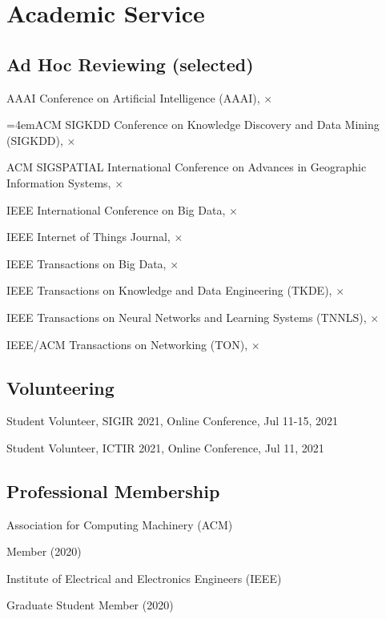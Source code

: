\section*{Academic Service}


\subsection*{\hspace{1.6em}Ad Hoc Reviewing (selected)}
\indent

AAAI Conference on Artificial Intelligence (AAAI), $\times$

\hangindent=4emACM SIGKDD Conference on Knowledge Discovery and Data Mining (SIGKDD), $\times$

ACM SIGSPATIAL International Conference on Advances in Geographic Information Systems, $\times$

IEEE International Conference on Big Data, $\times$

IEEE Internet of Things Journal, $\times$

IEEE Transactions on Big Data, $\times$

IEEE Transactions on Knowledge and Data Engineering (TKDE), $\times$

IEEE Transactions on Neural Networks and Learning Systems (TNNLS), $\times$

IEEE/ACM Transactions on Networking (TON), $\times$


\subsection*{\hspace{1.6em}Volunteering}
\indent 

Student Volunteer, SIGIR 2021, Online Conference, Jul 11-15, 2021

Student Volunteer, ICTIR 2021, Online Conference, Jul 11, 2021

\subsection*{\hspace{1.6em}Professional Membership}
\indent 

Association for Computing Machinery (ACM)  

\hspace{2em}Member (2020)

Institute of Electrical and Electronics Engineers (IEEE)

\hspace{2em}Graduate Student Member (2020)